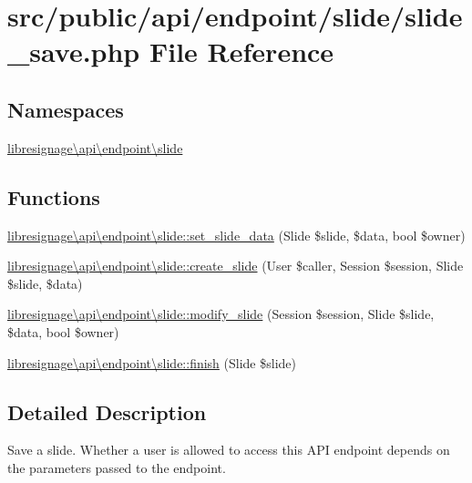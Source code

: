 \hypertarget{src_2public_2api_2endpoint_2slide_2slide__save_8php}{}\section{src/public/api/endpoint/slide/slide\+\_\+save.php File Reference}
\label{src_2public_2api_2endpoint_2slide_2slide__save_8php}
\subsection*{Namespaces}
\begin{DoxyCompactItemize}
\item 
 \hyperlink{namespacelibresignage_1_1api_1_1endpoint_1_1slide}{libresignage\textbackslash{}api\textbackslash{}endpoint\textbackslash{}slide}
\end{DoxyCompactItemize}
\subsection*{Functions}
\begin{DoxyCompactItemize}
\item 
\hyperlink{namespacelibresignage_1_1api_1_1endpoint_1_1slide_acd9b331303687c167e2101971e0a1968}{libresignage\textbackslash{}api\textbackslash{}endpoint\textbackslash{}slide\+::set\+\_\+slide\+\_\+data} (Slide \$slide, \$data, bool \$owner)
\item 
\hyperlink{namespacelibresignage_1_1api_1_1endpoint_1_1slide_a77dd0fedf73d886c2c4c08f72fbe1715}{libresignage\textbackslash{}api\textbackslash{}endpoint\textbackslash{}slide\+::create\+\_\+slide} (User \$caller, Session \$session, Slide \$slide, \$data)
\item 
\hyperlink{namespacelibresignage_1_1api_1_1endpoint_1_1slide_a0083bc7dc1513e4a25549e74cca6521d}{libresignage\textbackslash{}api\textbackslash{}endpoint\textbackslash{}slide\+::modify\+\_\+slide} (Session \$session, Slide \$slide, \$data, bool \$owner)
\item 
\hyperlink{namespacelibresignage_1_1api_1_1endpoint_1_1slide_a720121a1a9d64869e0980f74c6740766}{libresignage\textbackslash{}api\textbackslash{}endpoint\textbackslash{}slide\+::finish} (Slide \$slide)
\end{DoxyCompactItemize}


\subsection{Detailed Description}
Save a slide. Whether a user is allowed to access this A\+PI endpoint depends on the parameters passed to the endpoint.

